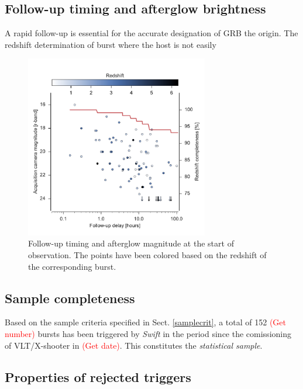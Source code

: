\documentclass{aa}    %
\newcommand\todo[1]{\textcolor{red}{(#1)}}
\begin{document}
\subsection{Follow-up timing and afterglow brightness}

A rapid follow-up is essential for the accurate designation of GRB the origin. The redshift determination of burst where the host is not easily 


\begin{figure}
	\centerline{\includegraphics[width=8cm]{figures/timing.pdf}}
	\caption{Follow-up timing and afterglow magnitude at the start of observation. The points have been colored based on the redshift of the corresponding burst. }
	\label{fig:timing}
\end{figure}


\subsection{Sample completeness}	

Based on the sample criteria specified in Sect. \ref{samplecrit}, a total of 152 \todo{Get number} bursts has been triggered by \textit{Swift} in the period since the comissioning of VLT/X-shooter in \todo{Get date}. This constitutes the \textit{statistical sample}.  



\subsection{Properties of rejected triggers} \label{badbursts}
\end{document}
